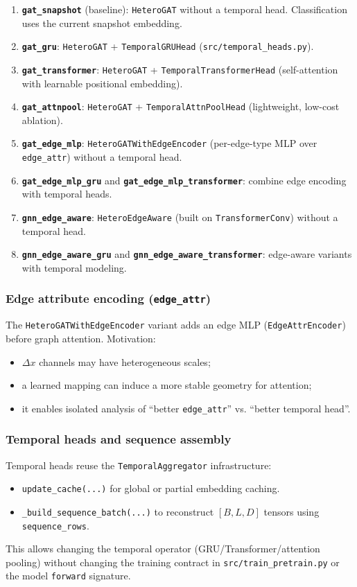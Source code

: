 \begin{enumerate}[leftmargin=*]
  \item \textbf{\texttt{gat\_snapshot}} (baseline): \texttt{HeteroGAT} without a temporal head. Classification uses the current snapshot embedding.
  \item \textbf{\texttt{gat\_gru}}: \texttt{HeteroGAT} + \texttt{TemporalGRUHead} (\texttt{src/temporal\_heads.py}).
  \item \textbf{\texttt{gat\_transformer}}: \texttt{HeteroGAT} + \texttt{TemporalTransformerHead} (self-attention with learnable positional embedding).
  \item \textbf{\texttt{gat\_attnpool}}: \texttt{HeteroGAT} + \texttt{TemporalAttnPoolHead} (lightweight, low-cost ablation).
  \item \textbf{\texttt{gat\_edge\_mlp}}: \texttt{HeteroGATWithEdgeEncoder} (per-edge-type MLP over \texttt{edge\_attr}) without a temporal head.
  \item \textbf{\texttt{gat\_edge\_mlp\_gru}} and \textbf{\texttt{gat\_edge\_mlp\_transformer}}: combine edge encoding with temporal heads.
  \item \textbf{\texttt{gnn\_edge\_aware}}: \texttt{HeteroEdgeAware} (built on \texttt{TransformerConv}) without a temporal head.
  \item \textbf{\texttt{gnn\_edge\_aware\_gru}} and \textbf{\texttt{gnn\_edge\_aware\_transformer}}: edge-aware variants with temporal modeling.
\end{enumerate}

\subsubsection{Edge attribute encoding (\texttt{edge\_attr})}
The \texttt{HeteroGATWithEdgeEncoder} variant adds an edge MLP
(\texttt{EdgeAttrEncoder}) before graph attention. Motivation:
\begin{itemize}[leftmargin=*]
  \item \(\Delta x\) channels may have heterogeneous scales;
  \item a learned mapping can induce a more stable geometry for attention;
  \item it enables isolated analysis of ``better \texttt{edge\_attr}'' vs. ``better temporal head''.
\end{itemize}

\subsubsection{Temporal heads and sequence assembly}
Temporal heads reuse the \texttt{TemporalAggregator} infrastructure:
\begin{itemize}[leftmargin=*]
  \item \texttt{update\_cache(...)} for global or partial embedding caching.
  \item \texttt{\_build\_sequence\_batch(...)} to reconstruct \([B, L, D]\) tensors using \texttt{sequence\_rows}.
\end{itemize}
This allows changing the temporal operator (GRU/Transformer/attention pooling)
without changing the training contract in \texttt{src/train\_pretrain.py} or the
model \texttt{forward} signature.

